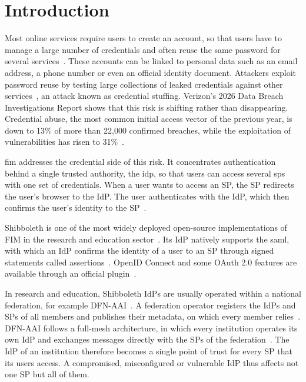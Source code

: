 \documentclass[../main.tex]{subfiles}
\begin{document}
\chapter{Introduction}\label{ch:introduction}

Most online services require users to create an account, so that users have to manage a large number 
of credentials and often reuse the same password for several services~\cite{PasswordReuse}. 
These accounts can be linked to personal data such as an email address, a phone number or 
even an official identity document. 
Attackers exploit password reuse by testing large collections of leaked credentials against other 
services~\cite{PasswordReuse}, an attack known as credential stuffing. 
Verizon's 2026 Data Breach Investigations Report shows that this risk is shifting rather than 
disappearing. 
Credential abuse, the most common initial access vector of the previous year, is down to 13\% of 
more than 22{,}000 confirmed breaches, while the exploitation of vulnerabilities has risen to 
31\%~\cite{VerizonDBIR2026}. 

\Gls{fim} addresses the credential side of this risk. 
It concentrates authentication behind a single trusted authority, the \gls{idp}, so that users 
can access several \glspl{sp} with one set of credentials. 
When a user wants to access an SP, the SP redirects the user's browser to the IdP. 
The user authenticates with the IdP, which then confirms the user's identity to the 
SP~\cite{FIMSurvey}. 

Shibboleth is one of the most widely deployed open-source implementations of FIM in the research 
and education sector~\cite{Shibboleth}. 
Its IdP natively supports the \gls{saml}, with which an IdP confirms 
the identity of a user to an SP through signed statements called assertions~\cite{SAMLOverview}. 
OpenID Connect and some OAuth 2.0 features are available through an official 
plugin~\cite{ShibbolethOIDC}. 

In research and education, Shibboleth IdPs are usually operated within a national federation, for 
example DFN-AAI~\cite{DFNAAI}. 
A federation operator registers the IdPs and SPs of all members and publishes their metadata, on 
which every member relies~\cite{DFNMRPS}. 
DFN-AAI follows a full-mesh architecture, in which every institution operates its own IdP and 
exchanges messages directly with the SPs of the federation~\cite{IdPSinglePointOfTrust}. 
The IdP of an institution therefore becomes a single point of trust for every SP that its users 
access. 
A compromised, misconfigured or vulnerable IdP thus affects not one SP but all of them.
\end{document}

